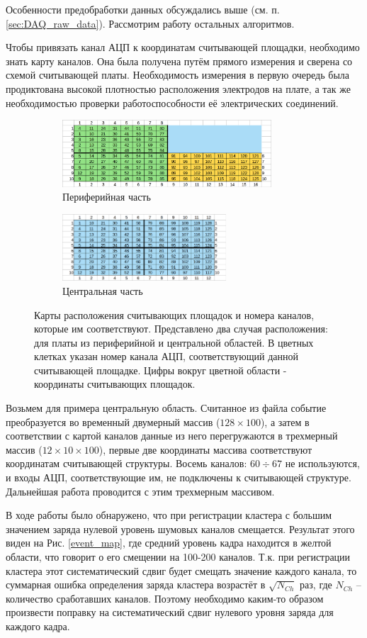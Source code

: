 Особенности предобработки данных обсуждались выше (см. п. \ref{sec:DAQ_raw_data}). Рассмотрим работу остальных алгоритмов.
\par Чтобы привязать канал АЦП к координатам считывающей площадки, необходимо знать карту каналов. Она была получена путём прямого измерения и сверена со схемой считывающей платы. Необходимость измерения в первую очередь была продиктована высокой плотностью расположения электродов на плате, а так же необходимостью проверки работоспособности её электрических соединений. 
\begin{figure}[H]
	\centering
	\begin{subfigure}{.5\textwidth}
		\centering
		\includegraphics[height = 2.5cm]{img/Side_pixmap.png}
		\caption{Периферийная часть}
	\end{subfigure}%
	\begin{subfigure}{.5\textwidth}
		\centering
		\includegraphics[height=2.5cm]{img/Center_pixmap.png}
		\caption{Центральная часть}
	\end{subfigure}
	\caption{Карты расположения считывающих площадок и номера каналов, которые им соответствуют. Представлено два случая расположения: для платы из периферийной и центральной областей. В цветных клетках указан номер канала АЦП, соответствующий данной считывающей площадке. Цифры вокруг цветной области - координаты считывающих площадок.}
	\label{fig:pixmap}
\end{figure}
Возьмем для примера центральную область. Считанное из файла событие преобразуется во временный двумерный массив ($128\times100$), а затем в соответствии с картой каналов данные из него перегружаются в трехмерный массив ($12\times10\times100$), первые две координаты массива соответствуют координатам считывающей структуры. Восемь каналов: $60\div67$ не используются, и входы АЦП, соответствующие им, не подключены к считывающей структуре. Дальнейшая работа проводится с этим трехмерным массивом.
\par В ходе работы было обнаружено, что при регистрации кластера с большим значением заряда нулевой уровень шумовых каналов смещается. Результат этого виден на Рис. \ref{event_map}, где средний уровень кадра находится в желтой области, что говорит о его смещении на 100-200 каналов. Т.к. при регистрации кластера этот систематический сдвиг будет смещать значение каждого канала, то суммарная ошибка определения заряда кластера возрастёт в $\sqrt{N_{Ch}}$ раз, где $N_{Ch}$ -- количество сработавших каналов. Поэтому необходимо каким-то образом произвести поправку на систематический сдвиг нулевого уровня заряда для каждого кадра.
